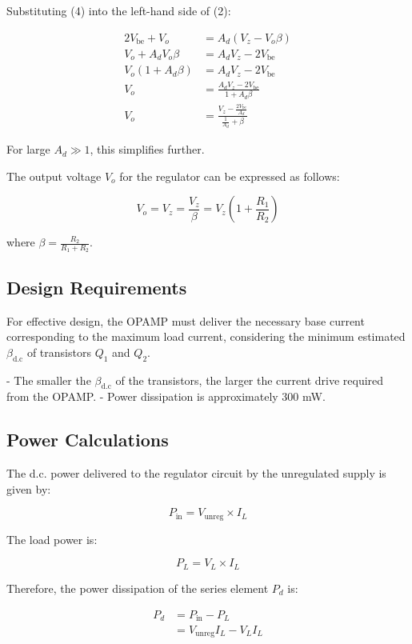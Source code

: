 \documentclass[a4paper,9pt,twoside,openany,twocolumn]{memoir}
\begin{document}
Substituting (4) into the left-hand side of (2):

\begin{align}
    2V_{\text{be}} + V_o &= A_d (V_z - V_o \beta) \tag{5} \\
    V_o + A_d V_o \beta &= A_d V_z - 2V_{\text{be}} \tag{6} \\
    V_o (1 + A_d \beta) &= A_d V_z - 2V_{\text{be}} \tag{7} \\
    V_o &= \frac{A_d V_z - 2V_{\text{be}}}{1 + A_d \beta} \tag{8} \\
    V_o &= \frac{V_z - \frac{2V_{\text{be}}}{A_d}}{\frac{1}{A_d} + \beta} \tag{9}
\end{align}

For large \( A_d \gg 1 \), this simplifies further.


The output voltage \( V_o \) for the regulator can be expressed as follows:

\[
V_o = V_z = \frac{V_z}{\beta} = V_z \left( 1 + \frac{R_1}{R_2} \right) \tag{10}
\]

where \( \beta = \frac{R_2}{R_1 + R_2} \).

\subsection*{Design Requirements}

For effective design, the OPAMP must deliver the necessary base current corresponding to the maximum load current, considering the minimum estimated \( \beta_{\text{d.c}} \) of transistors \( Q_1 \) and \( Q_2 \). 

- The smaller the \( \beta_{\text{d.c}} \) of the transistors, the larger the current drive required from the OPAMP. 
- Power dissipation is approximately 300 mW.

\subsection*{Power Calculations}

The d.c. power delivered to the regulator circuit by the unregulated supply is given by:

\[
P_{\text{in}} = V_{\text{unreg}} \times I_L \tag{1}
\]

The load power is:

\[
P_L = V_L \times I_L \tag{2}
\]

Therefore, the power dissipation of the series element \( P_d \) is:

\begin{align}
    P_d &= P_{\text{in}} - P_L \tag{3} \\
    &= V_{\text{unreg}} I_L - V_L I_L \tag{4}
\end{align}
\end{document}
